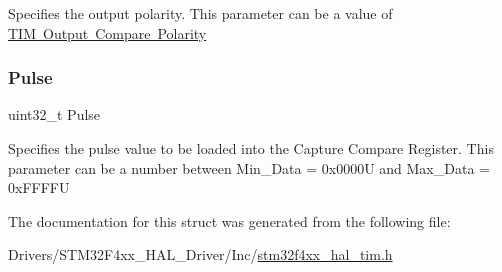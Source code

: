 Specifies the output polarity. This parameter can be a value of \mbox{\hyperlink{group___t_i_m___output___compare___polarity}{T\+IM Output Compare Polarity}} \mbox{\label{struct_t_i_m___one_pulse___init_type_def_a5251c3bce4ca5baf013bc0ace0865a4c}} 
\subsubsection{\texorpdfstring{Pulse}{Pulse}}
{\footnotesize\ttfamily uint32\+\_\+t Pulse}

Specifies the pulse value to be loaded into the Capture Compare Register. This parameter can be a number between Min\+\_\+\+Data = 0x0000U and Max\+\_\+\+Data = 0x\+F\+F\+F\+FU 

The documentation for this struct was generated from the following file\+:\begin{DoxyCompactItemize}
\item 
Drivers/\+S\+T\+M32\+F4xx\+\_\+\+H\+A\+L\+\_\+\+Driver/\+Inc/\mbox{\hyperlink{stm32f4xx__hal__tim_8h}{stm32f4xx\+\_\+hal\+\_\+tim.\+h}}\end{DoxyCompactItemize}
